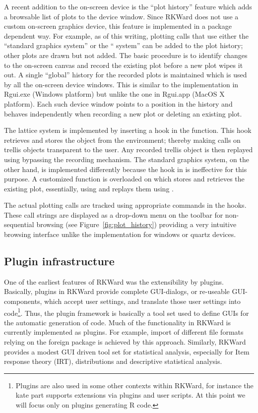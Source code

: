 A recent addition to the on-screen device is the ``plot history'' feature which
adds a browsable list of plots to the device window. Since RKWard does not use a
custom on-screen graphics device, this feature is implemented in a package
dependent way. For example, as of this writing, plotting calls that use either
the ``standard graphics system'' or the `` system'' can be added to the plot
history; other plots are drawn but not added. The basic procedure is to identify
changes to the on-screen canvas and record the existing plot before a new plot
wipes it out. A single ``global'' history for the recorded plots is maintained
which is used by all the on-screen device windows. This is similar to the
implementation in Rgui.exe (Windows platform) but unlike the one in Rgui.app
(MacOS X platform). Each such device window points to a position in the history
and behaves independently when recording a new plot or deleting an existing
plot.

The lattice system is implemented by inserting a hook in the 
function. This hook retrieves and stores the  object from the
 environment; thereby making  calls on trellis
objects transparent to the user. Any recorded trellis object is then replayed
using  bypassing the recording mechanism. The standard graphics
system, on the other hand, is implemented differently because the hook in
 is ineffective for this purpose. A customized function is overloaded
on  which stores and retrieves the existing plot, essentially, using
 and replays them using .

The actual plotting calls are tracked using appropriate  commands in
the hooks. These call strings are displayed as a drop-down menu on the toolbar
for non-sequential browsing (see Figure~\ref{fig:plot_history}) providing a very intuitive browsing
interface unlike the implementation for windows or quartz devices.

\subsection{Plugin infrastructure}
\label{sec:technical_plugins}
One of the earliest features of RKWard was the extensibility by plugins.
Basically, plugins in RKWard provide complete GUI-dialogs, or re-useable
GUI-components, which accept user settings, and translate those user settings
into  code\footnote{
    Plugins are also used in some other contexts within RKWard, for instance the
    kate part supports extensions via plugins and user scripts. At this point we
    will focus only on plugins generating R code.
}. Thus, the plugin framework is basically a tool set used to define
GUIs for the automatic generation of  code. Much of the functionality in RKWard
is currently implemented as plugins. For example, import of different file
formats relying on the foreign package is achieved by this approach. Similarly,
RKWard provides a modest GUI driven tool set for statistical analysis,
especially for Item response theory (IRT), distributions and descriptive
statistical analysis. 

